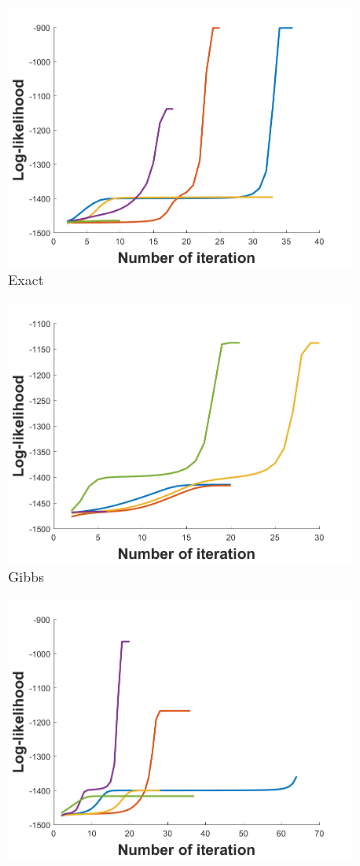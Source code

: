\documentclass{article}
\begin{document}
\begin{figure}
  \begin{subfigure}[b]{0.5\linewidth}
    \centering
    \includegraphics[width=0.75\linewidth]{init_fhmm.png} 
    \caption{Exact} 
  \end{subfigure}%
  \begin{subfigure}[b]{0.5\linewidth}
    \centering
    \includegraphics[width=0.75\linewidth]{init_gibbs.png} 
    \caption{Gibbs} 
  \end{subfigure} 
  \begin{subfigure}[b]{0.5\linewidth}
    \centering
    \includegraphics[width=0.75\linewidth]{init_cfva.png} 

\end{subfigure}
\end{figure}
\end{document}
